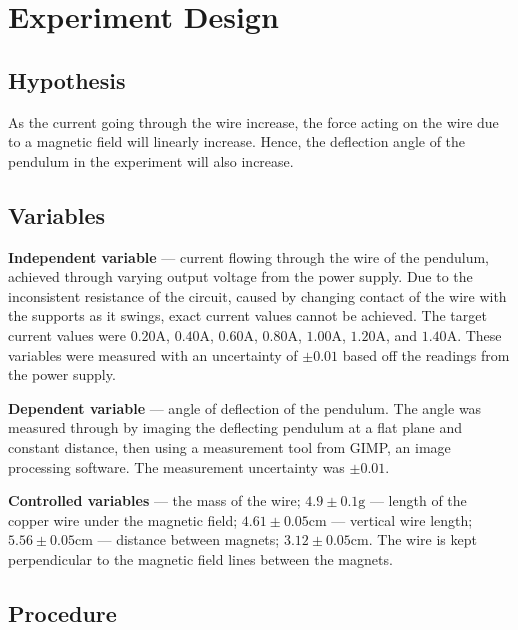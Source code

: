 \section*{Experiment Design}

\subsection*{Hypothesis}

As the current going through the wire increase, the force acting on the wire due to a magnetic field will linearly increase. Hence, the deflection angle of the pendulum in the experiment will also increase.

\subsection*{Variables}

\textbf{Independent variable} --- current flowing through the wire of the pendulum, achieved through varying output voltage from the power supply.
Due to the inconsistent resistance of the circuit, caused by changing contact of the wire with the supports as it swings, exact current values cannot be achieved.
The target current values were $0.20\si{\ampere}$, $0.40\si{\ampere}$, $0.60\si{\ampere}$, $0.80\si{\ampere}$, $1.00\si{\ampere}$, $1.20\si{\ampere}$, and $1.40\si{\ampere}$.
These variables were measured with an uncertainty of $\pm0.01$ based off the readings from the power supply.

\textbf{Dependent variable} --- angle of deflection of the pendulum. The angle was measured through by imaging the deflecting pendulum at a flat plane and constant distance, then using a measurement tool from GIMP, an image processing software. The measurement uncertainty was $\pm0.01$.

\textbf{Controlled variables} --- the mass of the wire; $4.9\pm0.1\si{\gram}$ --- length of the copper wire under the magnetic field; $4.61\pm0.05\si{\centi\meter}$ --- vertical wire length; $5.56\pm0.05\si{\centi\meter}$ --- distance between magnets; $3.12\pm0.05\si{\centi\meter}$.
The wire is kept perpendicular to the magnetic field lines between the magnets.

\subsection*{Procedure}

